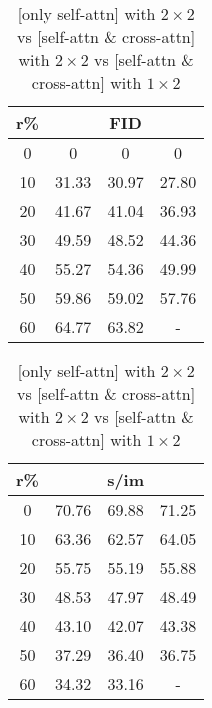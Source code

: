 \begin{table}[htp]
\caption{[only self-attn] with $2 \times 2$ vs [self-attn \& cross-attn] with $2 \times 2$ vs [self-attn \& cross-attn] with $1 \times 2$}
\label{table:exp_4}
    \begin{minipage}{0.48\textwidth}
        \centering
        \begin{tabular}{|c||c|c|c|}
            \hline
            \multicolumn{1}{|c||}{r\%} & \multicolumn{3}{c|}{FID}\\
            \hline
            0 & 0 & 0 & 0 \\
            10 & 31.33 & 30.97 & 27.80 \\
            20 & 41.67 & 41.04 & 36.93 \\
            30 & 49.59 & 48.52 & 44.36 \\
            40 & 55.27 & 54.36 & 49.99 \\
            50 & 59.86 & 59.02 & 57.76 \\
            60 & 64.77 & 63.82 & - \\
            \hline
        \end{tabular}
    \end{minipage}
    \hfill
    \begin{minipage}{0.48\textwidth}
        \centering
        \begin{tabular}{|c||c|c|c|}
            \hline
            \multicolumn{1}{|c||}{r\%} & \multicolumn{3}{c|}{s/im}\\
            \hline
            0 & 70.76 & 69.88 & 71.25 \\
            10 & 63.36 & 62.57 & 64.05 \\
            20 & 55.75 & 55.19 & 55.88 \\
            30 & 48.53 & 47.97 & 48.49 \\
            40 & 43.10 & 42.07 & 43.38 \\
            50 & 37.29 & 36.40 & 36.75 \\
            60 & 34.32 & 33.16 & - \\
            \hline
        \end{tabular}
    \end{minipage}
\end{table}